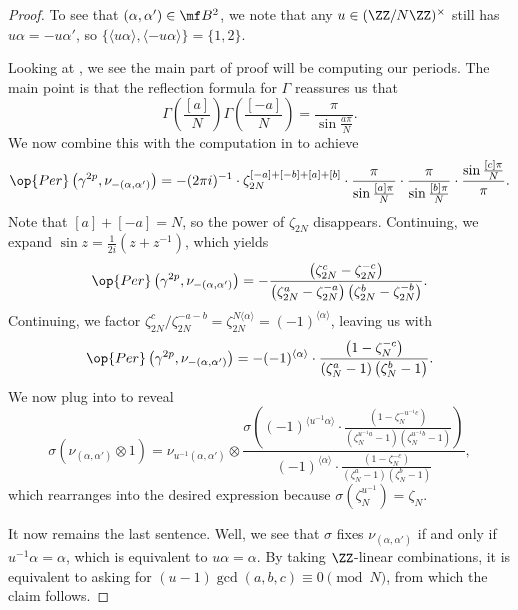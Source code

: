 \documentclass[../thesis.tex]{subfiles}
\begin{document}
\begin{proof}
	To see that $(\alpha,\alpha')\in\mf B^2$, we note that any $u\in(\ZZ/N\ZZ)^\times$ still has $u\alpha=-u\alpha'$, so $\{\langle u\alpha\rangle,\langle-u\alpha\rangle\}=\{1,2\}$.

	Looking at , we see the main part of proof will be computing our periods. The main point is that the reflection formula for $\Gamma$ reassures us that
	\[\Gamma\left(\frac{[a]}N\right)\Gamma\left(\frac{[-a]}N\right)=\frac\pi{\sin\frac{a\pi}N}.\]
	We now combine this with the computation in  to achieve
	\[\op{Per}\left(\gamma^{2p},\nu_{-(\alpha,\alpha')}\right) = -(2\pi i)^{-1}\cdot\zeta_{2N}^{[-a]+[-b]+[a]+[b]}\cdot\frac\pi{\sin\frac{[a]\pi}N}\cdot\frac\pi{\sin\frac{[b]\pi}N}\cdot\frac{\sin\frac{[c]\pi}N}\pi.\]
	Note that $[a]+[-a]=N$, so the power of $\zeta_{2N}$ disappears. Continuing, we expand $\sin z=\frac1{2i}\left(z+z^{-1}\right)$, which yields
	\[\op{Per}\left(\gamma^{2p},\nu_{-(\alpha,\alpha')}\right) = -\frac{\left(\zeta_{2N}^c-\zeta_{2N}^{-c}\right)}{\left(\zeta_{2N}^a-\zeta_{2N}^{-a}\right)\left(\zeta_{2N}^b-\zeta_{2N}^{-b}\right)}.\]
	Continuing, we factor $\zeta_{2N}^{c}/\zeta_{2N}^{-a-b}=\zeta_{2N}^{N\langle\alpha\rangle}=(-1)^{\langle\alpha\rangle}$, leaving us with
	\[\op{Per}\left(\gamma^{2p},\nu_{-(\alpha,\alpha')}\right) = -(-1)^{\langle\alpha\rangle}\cdot\frac{\left(1-\zeta_{N}^{-c}\right)}{\left(\zeta_{N}^a-1\right)\left(\zeta_{N}^b-1\right)}.\]
	We now plug into  to reveal
	\[\sigma(\nu_{(\alpha,\alpha')}\otimes1)=\nu_{u^{-1}(\alpha,\alpha')}\otimes\frac{\sigma\left((-1)^{\langle u^{-1}\alpha\rangle}\cdot\frac{\left(1-\zeta_{N}^{-u^{-1}c}\right)}{\left(\zeta_{N}^{u^{-1}a}-1\right)\left(\zeta_{N}^{u^{-1}b}-1\right)}\right)}{(-1)^{\langle\alpha\rangle}\cdot\frac{\left(1-\zeta_{N}^{-c}\right)}{\left(\zeta_{N}^a-1\right)\left(\zeta_{N}^b-1\right)}},\]
	which rearranges into the desired expression because $\sigma\left(\zeta_N^{u^{-1}}\right)=\zeta_N$.
	
	It now remains the last sentence. Well, we see that $\sigma$ fixes $\nu_{(\alpha,\alpha')}$ if and only if $u^{-1}\alpha=\alpha$, which is equivalent to $u\alpha=\alpha$. By taking $\ZZ$-linear combinations, it is equivalent to asking for $(u-1)\gcd(a,b,c)\equiv0\pmod N$, from which the claim follows.
\end{proof}

\end{document}
